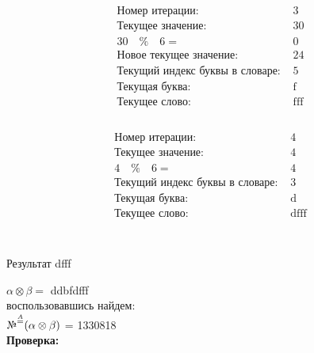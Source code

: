 \documentclass[letterpaper, 11pt]{extarticle}
\begin{document}
\begin{multicols}{2}
    \begin{align*}
        \begin{aligned}
            & \text{Номер итерации: }&3\\
            & \text{Текущее значение: }&30\\
            & 30 \quad \% \quad 6 =& 0 \\
            & \text{Новое текущее значение: }&24\\
            & \text{Текущий индекс буквы в словаре: }&5\\
            & \text{Текущая буква: }& \text{f}\\
            & \text{Текущее слово: }& \text{fff}\\
        \end{aligned}
    \end{align*}

    \begin{align*}
        \begin{aligned}
            & \text{Номер итерации: }&4\\
            & \text{Текущее значение: }&4\\
            & 4 \quad \% \quad 6 =& 4 \\
            & \text{Текущий индекс буквы в словаре: }&3\\
            & \text{Текущая буква: }& \text{d}\\
            & \text{Текущее слово: }& \text{dfff}\\
        \end{aligned}
    \end{align*}\\

    \begin{center}
        Результат \guillemotleft dfff\guillemotright\\
    \end{center}
\end{multicols}

\noindent $\alpha \otimes \beta =$ ddbfdfff \\

 воспользовавшись  найдем:\\

\noindent $\text{\textnumero}^{\stackrel{A}{=}} (\alpha \otimes \beta)$ = 
1330818\\

\noindent \textbf{Проверка:}\\
\end{document}
